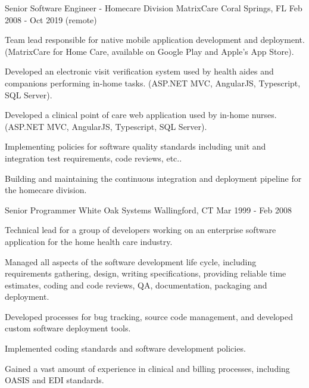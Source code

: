 \begin{cventries}
  \cventry
    {Senior Software Engineer - Homecare Division} %
    {MatrixCare} %
    {Coral Springs, FL} %
    {Feb 2008 - Oct 2019 (remote)} %
    {
      \begin{cvitems} %
        \item {Team lead responsible for native mobile application development and deployment. (MatrixCare for Home Care, available on Google Play and Apple's App Store).}
        \item {Developed an electronic visit verification system used by health aides and companions performing in-home tasks. (ASP.NET MVC, AngularJS, Typescript, SQL Server).}
        \item {Developed a clinical point of care web application used by in-home nurses. (ASP.NET MVC, AngularJS, Typescript, SQL Server).}
        \item {Implementing policies for software quality standards including unit and integration test requirements, code reviews, etc..}
        \item {Building and maintaining the continuous integration and deployment pipeline for the homecare division.}
      \end{cvitems}
    }
  \cventry
    {Senior Programmer} %
    {White Oak Systems} %
    {Wallingford, CT} %
    {Mar 1999 - Feb 2008} %
    {
      \begin{cvitems} %
        \item {Technical lead for a group of developers working on an enterprise software application for the home health care industry.}
        \item {Managed all aspects of the software development life cycle, including requirements gathering, design, writing specifications, providing reliable time estimates, coding and code reviews, QA, documentation, packaging and deployment.}
         \item {Developed processes for bug tracking, source code management, and developed custom software deployment tools.}
         \item {Implemented coding standards and software development policies.}
         \item {Gained a vast amount of experience in clinical and billing processes, including OASIS and EDI standards.}
      \end{cvitems}
    }


\end{cventries}
